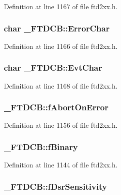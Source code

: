 Definition at line 1167 of file ftd2xx.h.\hypertarget{struct__FTDCB_a0b8fa24da4dcdba892abd2c6cdb55707}{
\subsubsection[{ErrorChar}]{\setlength{\rightskip}{0pt plus 5cm}char {\bf \_\-FTDCB::ErrorChar}}}
\label{struct__FTDCB_a0b8fa24da4dcdba892abd2c6cdb55707}


Definition at line 1166 of file ftd2xx.h.\hypertarget{struct__FTDCB_a579b4755ad4a7ea9c76ddaf5f548a460}{
\subsubsection[{EvtChar}]{\setlength{\rightskip}{0pt plus 5cm}char {\bf \_\-FTDCB::EvtChar}}}
\label{struct__FTDCB_a579b4755ad4a7ea9c76ddaf5f548a460}


Definition at line 1168 of file ftd2xx.h.\hypertarget{struct__FTDCB_a507847cee5b863ccdb1949b8897940e1}{
\subsubsection[{fAbortOnError}]{ {\bf \_\-FTDCB::fAbortOnError}}}
\label{struct__FTDCB_a507847cee5b863ccdb1949b8897940e1}


Definition at line 1156 of file ftd2xx.h.\hypertarget{struct__FTDCB_a66a920f15680e8bc01bc4b9d7e1e442a}{
\subsubsection[{fBinary}]{ {\bf \_\-FTDCB::fBinary}}}
\label{struct__FTDCB_a66a920f15680e8bc01bc4b9d7e1e442a}


Definition at line 1144 of file ftd2xx.h.\hypertarget{struct__FTDCB_a18de82101e19a3c2be9226489e7df0b2}{
\subsubsection[{fDsrSensitivity}]{ {\bf \_\-FTDCB::fDsrSensitivity}}}
\label{struct__FTDCB_a18de82101e19a3c2be9226489e7df0b2}


